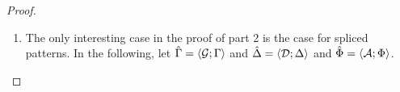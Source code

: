 {{{{\begin{proof}
\begin{enumerate}
  \item The only interesting case in the proof of part 2 is the case for spliced patterns. In the following, let $\hat\Gamma=\langle \mathcal{G}; \Gamma \rangle$ and $\hat{\Delta}=\langle \mathcal{D}; \Delta \rangle$ and $\hat\Phi=\langle \mathcal{A}; \Phi \rangle$.
  \begin{byCases}

\end{byCases}
\end{enumerate}
\end{proof}}}}}
